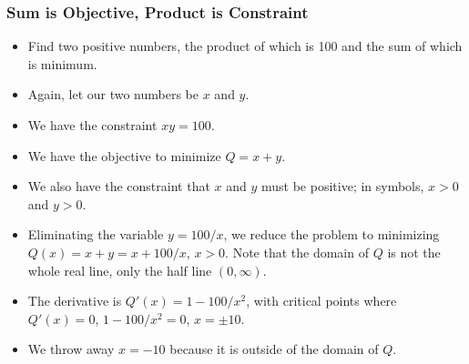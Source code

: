 \documentclass[serif,ignorenonframetext]{beamer}
\begin{document}
\begin{frame}
  \frametitle{Sum is Objective, Product is Constraint}
  \begin{itemize}[<+->]
  \item Find two positive numbers, the product of which is 100 and the
    sum of which is minimum.
  \item Again, let our two numbers be $x$ and $y$.
  \item We have the constraint $xy=100$.
  \item We have the objective to minimize $Q=x+y$.
  \item We also have the constraint that $x$ and $y$ must be positive;
    in symbols, $x>0$ and $y>0$.
  \item Eliminating the variable $y=100/x$, we reduce the problem to
    minimizing $Q(x)=x+y=x+100/x$, $x>0$.  Note that the domain of $Q$ 
    is not the whole real line, only the half line $(0,\infty)$.
  \item The derivative is $Q'(x)=1-100/x^2$, with critical points
    where $Q'(x)=0$, $1-100/x^2=0$, $x=\pm 10$.
  \item We throw away $x=-10$ because it is outside of the domain of $Q$.
  \end{itemize}
\end{frame}
\end{document}
